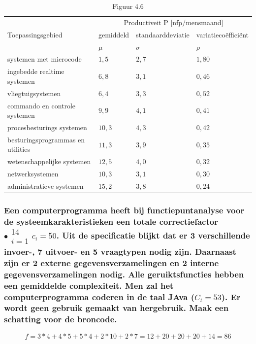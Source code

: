 \documentclass[a4paper,titlepage]{artikel1}
\begin{document}
   \begin{center}
   \begin{table}[h] %
     \caption{Figuur 4.6}\label{reffig46}
     \begin{center}
     \begin{tabular}[t]{|l|l|l|l|}
       \hline
       \multirow{3}{*}{Toepassingsgebied} & \multicolumn{3}{c|}{Productiveit P [nfp/mensmaand]} \\
       \cline{2-4}
       & gemiddeld & standaarddeviatie & variatieco\"{e}ffici\"{e}nt \\
       & $\mu$ & $\sigma$ & $\rho$ \\
       \hline
       systemen met microcode & $1,5$ & $2,7$ & $1,80$ \\
       ingebedde realtime systemen & $6,8$ & $3,1$ & $0,46$ \\
       vliegtuigsystemen & $6,4$ & $3,3$ & $0,52$ \\
       commando en controle systemen & $9,9$ & $4,1$ & $0,41$ \\
       procesbesturings systemen & $10,3$ & $4,3$ & $0,42$ \\
       besturingsprogrammas en utilities & $11,3$ & $3,9$ & $0,35$ \\
       wetenschappelijke systemen & $12,5$ & $4,0$ & $0,32$ \\
       netwerksystemen & $10,3$ & $3,1$ & $0,30$ \\
       administratieve systemen & $15,2$ & $3,8$ & $0,24$ \\
       \hline
     \end{tabular}
     \end{center}
   \end{table}
   \end{center}
   
   \subsubsection[Opdracht 6]{Een computerprogramma heeft bij functiepuntanalyse voor de systeemkarakteristieken een totale correctiefactor $\bullet \begin{array}{c}14\\i=1 \end{array} c_i=50$. Uit de specificatie blijkt dat er 3 verschillende invoer-, 7 uitvoer- en 5 vraagtypen nodig zijn. Daarnaast zijn er 2 externe gegevensverzamelingen en 2 interne gegevensverzamelingen nodig. Alle geruiktsfuncties hebben een gemiddelde complexiteit. Men zal het computerprogramma coderen in de taal JAva ($C_t=53$). Er wordt geen gebruik gemaakt van hergebruik. Maak een schatting voor de broncode.}
   \begin{displaymath}
    f=3*4+4*5+5*4+2*10+2*7=12+20+20+20+14=86
   \end{displaymath}
   
\end{document}
